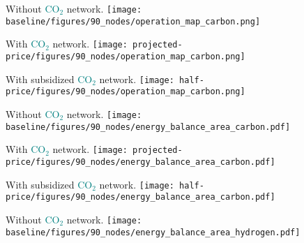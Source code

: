 \documentclass[12pt, aspectratio=169]{beamer}
\newcommand{\carbon}{\textcolor{teal}{CO$_2$}}
\begin{document}
\begin{frame}
    \begin{center}
    Without \carbon{} network.
    \texttt{[image: baseline/figures/90\_nodes/operation\_map\_carbon.png]}
    \end{center}
\end{frame}



\begin{frame}
    \begin{center}
    With \carbon{} network.
    \texttt{[image: projected-price/figures/90\_nodes/operation\_map\_carbon.png]}
    \end{center}
\end{frame}


\begin{frame}
    \begin{center}
    With subsidized \carbon{} network.
    \texttt{[image: half-price/figures/90\_nodes/operation\_map\_carbon.png]}
    \end{center}
\end{frame}


\begin{frame}
    \begin{center}
    Without \carbon{} network.
    \texttt{[image: baseline/figures/90\_nodes/energy\_balance\_area\_carbon.pdf]}
    \end{center}
\end{frame}


\begin{frame}
    \begin{center}
    With \carbon{} network.
    \texttt{[image: projected-price/figures/90\_nodes/energy\_balance\_area\_carbon.pdf]}
    \end{center}
\end{frame}


\begin{frame}
    \begin{center}
    With subsidized \carbon{} network.
    \texttt{[image: half-price/figures/90\_nodes/energy\_balance\_area\_carbon.pdf]}
    \end{center}
\end{frame}


\begin{frame}
    \begin{center}
    Without \carbon{} network.
    \texttt{[image: baseline/figures/90\_nodes/energy\_balance\_area\_hydrogen.pdf]}
    \end{center}
\end{frame}
\end{document}
